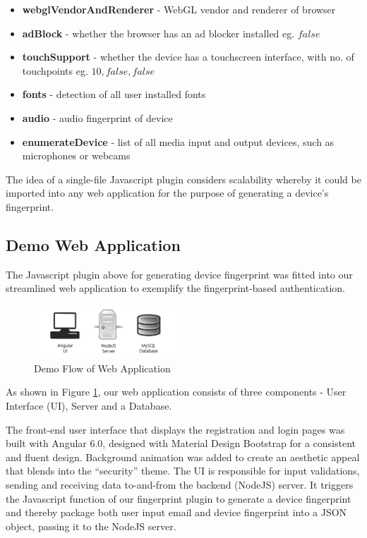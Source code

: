 \documentclass{acm_proc_article-sp}
\begin{document}
\begin{itemize}
    \item\textbf{ webglVendorAndRenderer} - WebGL vendor and renderer of browser
    \item\textbf{ adBlock} - whether the browser has an ad blocker installed eg. $false$
    \item\textbf{ touchSupport} - whether the device has a touchscreen interface, with no. of touchpoints eg. $10, false,false$
    \item\textbf{ fonts} - detection of all user installed fonts
    \item\textbf{ audio} - audio fingerprint of device
    \item\textbf{ enumerateDevice} -  list of all media input and output devices, such as microphones or webcams

\end{itemize}



The idea of a single-file Javascript plugin considers scalability whereby it could be imported into any web application for the purpose of generating a device’s fingerprint.

\subsection{Demo Web Application}
The Javascript plugin above for generating device fingerprint was fitted into our streamlined web application to exemplify the fingerprint-based authentication.

\begin{figure}[h]
    \centering
    \includegraphics[width=0.5\textwidth]{assets/fig3-demo-flow.png}
    \caption{Demo Flow of Web Application}
    \label{fig:demo-flow}
\end{figure}

As shown in Figure \ref{fig:demo-flow}, our web application consists of three components - User Interface (UI), Server and a Database.

The front-end user interface that displays the registration and login pages was built with Angular 6.0, designed with Material Design Bootstrap for a consistent and fluent design. Background animation was added to create an aesthetic appeal that blends into the “security” theme. The UI is responsible for input validations, sending and receiving data to-and-from the backend (NodeJS) server. It triggers the Javascript function of our fingerprint plugin to generate a device fingerprint and thereby package both user input email and device fingerprint into a JSON object, passing it to the NodeJS server.
\end{document}
